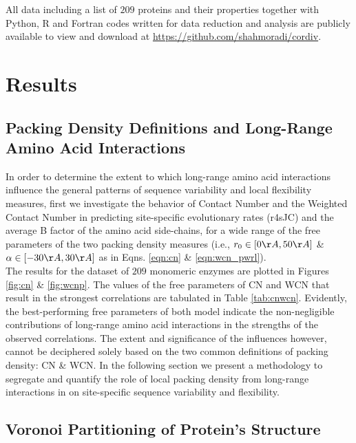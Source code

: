 \documentclass[11pt]{article}
\begin{document}
    All data including a list of $209$ proteins and their properties together with Python, R and Fortran codes written for data reduction and analysis are publicly available to view and download at \url{https://github.com/shahmoradi/cordiv}.


\section{Results}

    \subsection*{Packing Density Definitions and Long-Range Amino Acid Interactions}
    \label{sec:cnwcn}

    In order to determine the extent to which long-range amino acid interactions influence the general patterns of sequence variability and local flexibility measures, first we investigate the behavior of Contact Number and the Weighted Contact Number in predicting site-specific evolutionary rates (r4sJC) and the average B factor of the amino acid side-chains, for a wide range of the free parameters of the two packing density measures (i.e., $r_0\in[0\AA,50\AA]$ \& $\alpha\in[-30\AA,30\AA]$ as in Eqns. \ref{eqn:cn} \& \ref{eqn:wcn_pwrl}). \\

    The results for the dataset of $209$ monomeric enzymes are plotted in Figures \ref{fig:cn} \& \ref{fig:wcnp}. The values of the free parameters of CN and WCN that result in the strongest correlations are tabulated in Table \ref{tab:cnwcn}. Evidently, the best-performing free parameters of both model indicate the non-negligible contributions of long-range amino acid interactions in the strengths of the observed correlations. The extent and significance of the influences however, cannot be deciphered solely based on the two common definitions of packing density: CN \& WCN. In the following section we present a methodology to segregate and quantify the role of local packing density from long-range interactions in on site-specific sequence variability and flexibility.


    \subsection*{Voronoi Partitioning of Protein's Structure}
    \label{sec:voro}
\end{document}
